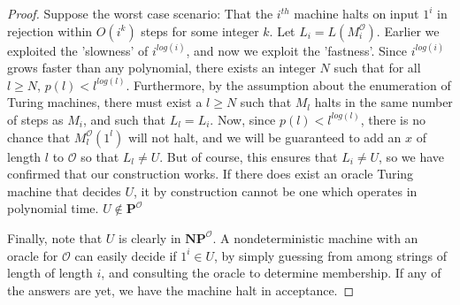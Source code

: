 \begin{proof}
    \par Suppose the worst case scenario: That the $i^{th}$ machine halts on input $1^i$ in rejection within $O(i^k)$ steps for some integer $k$. Let $L_i = L(M_i^{\mathcal{O}})$. Earlier we exploited the 'slowness' of $i^{log(i)}$, and now we exploit the 'fastness'. Since $i^{log(i)}$ grows faster than any polynomial, there exists an integer $N$ such that for all $l \geq N$, $p(l)<l^{log(l)}$. Furthermore, by the assumption about the enumeration of Turing machines, there must exist a $l \geq N$ such that $M_l$ halts in the same number of steps as $M_i$, and such that $L_l = L_i$. Now, since $p(l) < l^{log(l)}$, there is no chance that $M_l^{\mathcal{O}}(1^l)$ will not halt, and we will be guaranteed to add an $x$ of length $l$ to $\mathcal{O}$ so that $L_l \neq U$. But of course, this ensures that $L_i \neq U$, so we have confirmed that our construction works. If there does exist an oracle Turing machine that decides $U$, it by construction cannot be one which operates in polynomial time. $U \notin \textbf{P}^{\mathcal{O}}$
    \par Finally, note that $U$ is clearly in $\textbf{NP}^{\mathcal{O}}$. A nondeterministic machine with an oracle for $\mathcal{O}$ can easily decide if $1^i \in U$, by simply guessing from among strings of length of length $i$, and consulting the oracle to determine membership. If any of the answers are yet, we have the machine halt in acceptance.
\end{proof}

